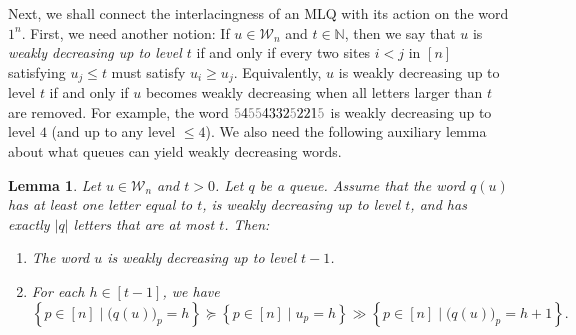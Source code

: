 \documentclass[reqno]{amsart}
\newcommand{\0}{\phantom{c}}
\newcommand{\mcW}{\mathcal{W}}
\newcommand{\NN}{\mathbb{N}}
\newcommand{\set}[1]{\left\{ #1 \right\}}
\newcommand{\abs}[1]{\left| #1 \right|}
\newcommand{\ive}[1]{\left[ #1 \right]}
\newcommand{\defn}[1]{{\color{darkred}\emph{#1}}} %
\theoremstyle{plain}
\newtheorem{lemma}[thm]{Lemma}
\theoremstyle{definition}
\numberwithin{equation}{section}
\begin{document}
Next, we shall connect the interlacingness of an MLQ with its action on the word $1^n$.
First, we need another notion:
If $u \in \mcW_n$ and $t \in \NN$, then we say that $u$ is \defn{weakly decreasing up to level $t$} if and only if every two sites $i < j$ in $\ive{n}$ satisfying $u_j \leq t$ must satisfy $u_i \geq u_j$.
Equivalently, $u$ is weakly decreasing up to level $t$ if and only if $u$ becomes weakly decreasing when all letters larger than $t$ are removed.
For example, the word ${\color{gray}5}4{\color{gray}55}4332{\color{gray}5}221{\color{gray}5}$ is weakly decreasing up to level $4$ (and up to any level $\leq 4$).
We also need the following auxiliary lemma about what queues can yield weakly decreasing words.

\begin{lemma}
\label{lem:determinant_form.interl-A}
Let $u \in \mcW_n$ and $t > 0$.
Let $q$ be a queue.
Assume that the word $q(u)$ has at least one letter equal to $t$, is weakly decreasing up to level $t$, and has exactly $\abs{q}$ letters that are at most $t$.
Then:

\begin{enumerate}
\item[(a)] The word $u$ is weakly decreasing up to level $t-1$.

\item[(b)] For each $h \in \ive{t-1}$, we have
\[
\set{ p \in \ive{n} \mid \bigl( q(u) \bigr)_p = h }
\succeq
\set{ p \in \ive{n} \mid u_p = h }
\gg
\set{ p \in \ive{n} \mid \bigl( q(u) \bigr)_p = h+1 } .
\]
\end{enumerate}
\end{lemma}
\end{document}
